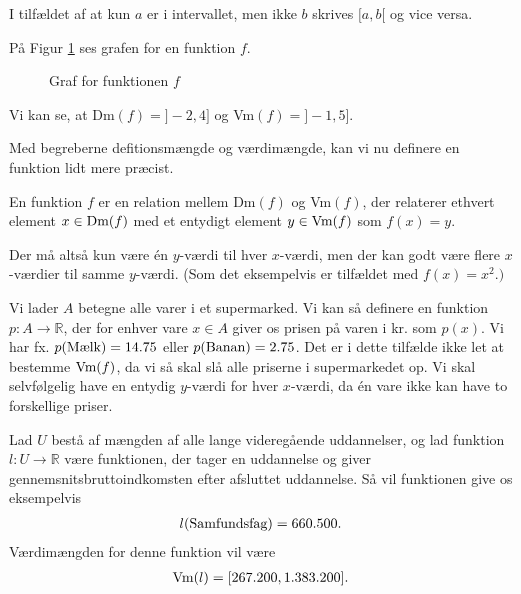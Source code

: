 I tilfældet af at kun $a$ er i intervallet, men ikke $b$ skrives $[a,b[$ og vice versa.
\begin{exa}
	På Figur \ref{fig:f1} ses grafen for en funktion $f$.
	\begin{figure}[H]
		\centering
		\caption{Graf for funktionen $f$}
		\label{fig:f1}
	\end{figure}
	Vi kan se, at Dm$(f) = ]-2,4]$ og Vm$(f) = ]-1,5]$.
\end{exa}

Med begreberne defitionsmængde og værdimængde, kan vi nu definere en funktion lidt mere præcist.
\begin{defn}[Funktion]
	En funktion $f$ er en relation mellem Dm$(f)$ og Vm$(f)$, der relaterer ethvert element 
	$x\in \textnormal{Dm}(f)$ med et entydigt element $y \in \textnormal{Vm}(f)$ som $f(x) = y$. 
\end{defn}
Der må altså kun være én $y$-værdi til hver $x$-værdi, men der kan godt være flere $x$-værdier til samme $y$-værdi. (Som det eksempelvis er tilfældet med $f(x) = x^2.)$
\begin{exa}
	Vi lader $A$ betegne alle varer i et supermarked. Vi kan så definere en funktion
	$p:A \to \mathbb{R}$, der for enhver vare $x \in A$ giver os prisen på varen i kr. som $p(x)$. 
	Vi har fx. $p(\textnormal{Mælk}) = 14.75$ eller $p(\textnormal{Banan}) = 2.75$. Det er i dette tilfælde 
	ikke let at bestemme $\textnormal{Vm}(f)$, da vi så skal slå alle priserne i supermarkedet op. Vi skal 
	selvfølgelig have en entydig $y$-værdi for hver $x$-værdi, da én vare ikke kan have to forskellige priser.
\end{exa}
\begin{exa}\label{exa:udd}
Lad $U$ bestå af mængden af alle lange videregående uddannelser, og lad funktion $l:U \to \mathbb{R}$ være funktionen, der tager en uddannelse og giver gennemsnitsbruttoindkomsten efter afsluttet uddannelse. Så vil funktionen give os eksempelvis
\begin{align*}
l(\textnormal{Samfundsfag}) = 660.500.
\end{align*}
Værdimængden for denne funktion vil være
\begin{align*}
\textnormal{Vm}(l) = [267.200,1.383.200].
\end{align*}
\end{exa}

